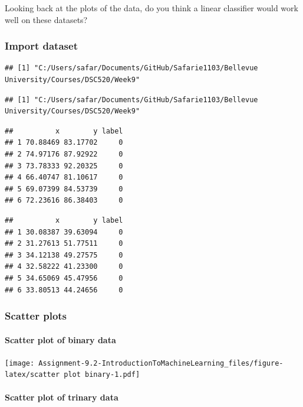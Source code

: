 \documentclass[
]{article}
\begin{document}
Looking back at the plots of the data, do you think a linear classifier
would work well on these datasets?

\hypertarget{import-dataset}{%
\subsubsection{Import dataset}\label{import-dataset}}

\begin{verbatim}
## [1] "C:/Users/safar/Documents/GitHub/Safarie1103/Bellevue University/Courses/DSC520/Week9"
\end{verbatim}

\begin{verbatim}
## [1] "C:/Users/safar/Documents/GitHub/Safarie1103/Bellevue University/Courses/DSC520/Week9"
\end{verbatim}

\begin{verbatim}
##          x        y label
## 1 70.88469 83.17702     0
## 2 74.97176 87.92922     0
## 3 73.78333 92.20325     0
## 4 66.40747 81.10617     0
## 5 69.07399 84.53739     0
## 6 72.23616 86.38403     0
\end{verbatim}

\begin{verbatim}
##          x        y label
## 1 30.08387 39.63094     0
## 2 31.27613 51.77511     0
## 3 34.12138 49.27575     0
## 4 32.58222 41.23300     0
## 5 34.65069 45.47956     0
## 6 33.80513 44.24656     0
\end{verbatim}

\hypertarget{scatter-plots}{%
\subsubsection{Scatter plots}\label{scatter-plots}}

\hypertarget{scatter-plot-of-binary-data}{%
\paragraph{Scatter plot of binary
data}\label{scatter-plot-of-binary-data}}

\texttt{[image: Assignment-9.2-IntroductionToMachineLearning\_files/figure-latex/scatter plot binary-1.pdf]}

\hypertarget{scatter-plot-of-trinary-data}{%
\paragraph{Scatter plot of trinary
data}\label{scatter-plot-of-trinary-data}}
\end{document}
